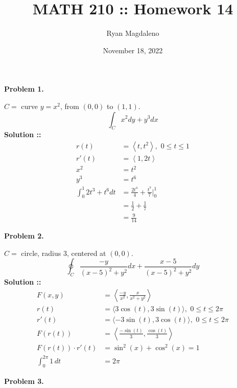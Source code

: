 \documentclass[11pt]{article}
\date{November 18, 2022}
\title{MATH 210 :\hspace{2px}: Homework 14}
\author{Ryan Magdaleno}
\begin{document}
\maketitle


\textbf{Problem 1.}

$C=$ curve $y=x^2$, from $(0,0)$ to $(1, 1)$.
$$\int_C x^2 dy+y^3 dx$$
\vspace{5px}\textbf{Solution ::}
\begin{align}
    r(t) &= \left\langle t, t^2\right\rangle,\,\, 0\le t\le 1 \\
    r'(t) &= \left\langle1, 2t\right\rangle  \\
    x^2 &= t^2 \\
    y^3 &= t^6 \\
    \int_{0}^{1} 2t^3 + t^6 dt &= \frac{2t^4}{4} + \frac{t^7}{7}\bigg|^1_0 \\
    &= \frac{1}{2} + \frac{1}{7} \\
    &= \frac{9}{14}
\end{align}
\pagebreak


\textbf{Problem 2.}

$C = $ circle, radius 3, centered at $(0, 0)$.
$$\oint_C \frac{-y}{(x-5)^2+y^2}dx + \frac{x-5}{(x-5)^2 + y^2} dy$$
\vspace{5px}\textbf{Solution ::}
\begin{align}
    F(x,y)&=\left\langle\frac{-y}{x^2}, \frac{x}{x^2 + y^2}\right\rangle \\
    r(t)&= \langle3\cos(t), 3\sin(t)\rangle,\,\,0\le t\le 2\pi \\
    r'(t) &= \langle-3\sin(t), 3\cos(t)\rangle,\,\,0\le t\le 2\pi \\
    F(r(t)) &= \left\langle\frac{-\sin(t)}{3}, \frac{\cos(t)}{3}\right\rangle \\
    F(r(t))\cdot r'(t) &= \sin^2(x) + \cos^2(x) = 1 \\
    \int_{0}^{2\pi} 1\,dt &= 2\pi
\end{align}
\pagebreak


\textbf{Problem 3.}
\end{document}
